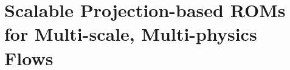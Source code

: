 \chapter{Scalable Projection-based ROMs for Multi-scale, Multi-physics Flows}
\label{chap:CavityAndCVRC}




